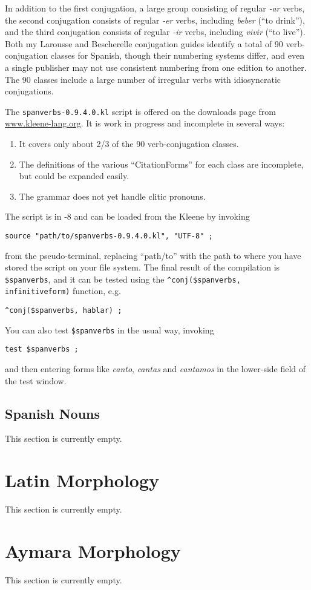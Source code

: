 In addition to the first conjugation, a large group consisting of regular
\mbox{\emph{-ar}} verbs, 
the second conjugation consists of regular \mbox{\emph{-er}} verbs, including \emph{beber} (``to drink''), and the third conjugation consists of
regular \mbox{\emph{-ir}} verbs, including \emph{vivir} (``to live'').  Both my Larousse and Bescherelle conjugation guides identify a total
of 90 verb-conjugation classes for Spanish, though their numbering systems differ, and even a
single publisher may not use consistent numbering from one edition to another.  The 90 classes
include a large number of irregular verbs with idiosyncratic conjugations.

The \verb!spanverbs-0.9.4.0.kl! script is offered on the downloads page from
\url{www.kleene-lang.org}.  It is work in progress and incomplete in several
ways:

\begin{enumerate}
	\item
It covers only about 2/3 of the 90 verb-conjugation classes.
\item
The definitions of the various ``CitationForms'' for each class are incomplete,
but could be expanded easily.
\item
The grammar does not yet handle clitic pronouns.
\end{enumerate}

\noindent
The script is in -8 and can be loaded from the Kleene \gui{} by
invoking


\begin{Verbatim}
source "path/to/spanverbs-0.9.4.0.kl", "UTF-8" ;
\end{Verbatim}

\noindent
from the pseudo-terminal, replacing ``path/to'' with the path to where
you have stored the script on your file system.  The final result of the compilation is
\verb!$spanverbs!, and it can be tested using the 
\verb!^conj($spanverbs, infinitiveform)! function, e.g.


\begin{Verbatim}
^conj($spanverbs, hablar) ;
\end{Verbatim}

You can also test \verb!$spanverbs! in the usual way, invoking


\begin{Verbatim}
test $spanverbs ;
\end{Verbatim}

\noindent
and then entering forms like \emph{canto}, \emph{cantas} and \emph{cantamos}
in the lower-side field of the test window.


\subsection{Spanish Nouns}

This section is currently empty.

\section{Latin Morphology}

This section is currently empty.

\section{Aymara Morphology}

This section is currently empty.
